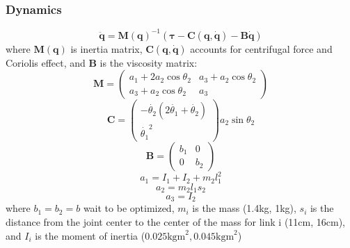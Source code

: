 \subsubsection{Dynamics}
\begin{equation} \label{dynamics}
	\ddot{\bm{q}} = \bm{M}(\bm{q})^{-1} (\bm{\tau} - \bm{C}(\bm{q}, \dot{\bm{q}}) - \bm{B}\dot{\bm{q}})
\end{equation}
where $\bm{M}(\bm{q})$ is inertia matrix, $\bm{C}(\bm{q}, \dot{\bm{q}})$ accounts for centrifugal force and Coriolis effect, and $\bm{B}$ is the viscosity matrix:
\begin{equation}
	\bm{M} = \left( \begin{matrix} a_1 + 2a_2\cos\theta_2  &  a_3 + a_2 \cos\theta_2 \\
										a_3 + a_2 \cos\theta_2   &  a_3
				\end{matrix}\right)
\end{equation}
\begin{equation}
	\bm{C} = \left( \begin{matrix} -\dot{\theta_2}(2\dot{\theta_1}+\dot{\theta_2}) \\
										\dot{\theta_1}^2	\end{matrix} \right)
				a_2\sin{\theta_2}
\end{equation}
\begin{equation}
	\bm{B} = \left( \begin{matrix} b_1  & 0 \\ 0 & b_2 \end{matrix} \right)
\end{equation}
\begin{equation}
a_1 = I_1 + I_2 + m_2 l_1^2
\end{equation}
\begin{equation}
a_2 = m_2 l_1 s_2
\end{equation}
\begin{equation}
a_3 = I_2
\end{equation}
where $b_1 = b_2 = b$ wait to be optimized, $m_i$ is the mass (1.4kg, 1kg), $s_i$ is the distance from the joint center to the center of the mass for link i (11cm, 16cm), and $I_i$ is the moment of inertia ($0.025\text{kgm}^2, 0.045\text{kgm}^2$)


